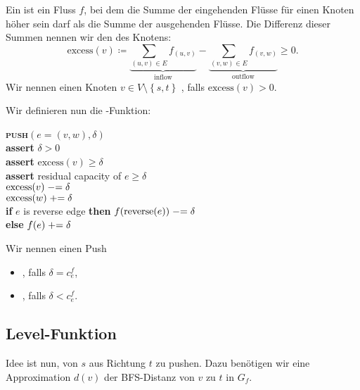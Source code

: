 \begin{definition}[Preflow]
  Ein  ist ein Fluss \( f \), bei dem die Summe der eingehenden Flüsse für einen Knoten höher sein darf als die Summe der ausgehenden Flüsse. Die Differenz dieser Summen nennen wir den  des Knotens:
  \begin{equation*}
    \text{excess}(v) \coloneqq \underbrace{\sum_{(u,v) \in E} f_{(u,v)}}_{\text{inflow}} - \underbrace{\sum_{(v,w) \in E} f_{(v,w)}}_{\text{outflow}} \geq 0\text{.}
  \end{equation*}
  Wir nennen einen Knoten \( v \in V \setminus \left \{ s, t \right \} \) , falls \( \text{excess}(v) > 0 \).
\end{definition}

Wir definieren nun die -Funktion:

\begin{pseudocode}
  \textbf{\textsc{push}}\( (e = (v,w), \delta) \) \\
  \phantom{\enskip} \textbf{assert} \( \delta > 0 \) \\
  \phantom{\enskip} \textbf{assert} \(  \text{excess}(v) \geq \delta \) \\
  \phantom{\enskip} \textbf{assert} residual capacity of \( e \geq \delta \) \\
  \phantom{\enskip} \( \text{excess}(v) \mathrel{-}= \delta \) \\
  \phantom{\enskip} \( \text{excess}(w) \mathrel{+}= \delta \) \\
  \phantom{\enskip} \textbf{if} \( e \) is reverse edge \textbf{then} \( f(\text{reverse}(e)) \mathrel{-}= \delta \) \\
  \phantom{\enskip} \textbf{else} \( f(e) \mathrel{+}= \delta \)
\end{pseudocode}

Wir nennen einen Push
\begin{itemize}
  \item {}, falls \( \delta = c_e^f \),
  \item {}, falls \( \delta < c_e^f \).
\end{itemize}

\subsection{Level-Funktion}

Idee ist nun, von \( s \) aus Richtung \( t \) zu pushen. Dazu benötigen wir eine Approximation \( d(v) \) der BFS-Distanz von \( v \) zu \( t \) in \( G_f \).

